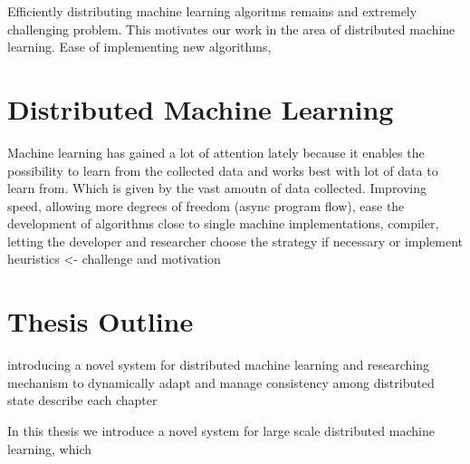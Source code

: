 Efficiently distributing machine learning algoritms remains and extremely challenging problem. This motivates our work in the area of distributed machine learning. Ease of implementing new algorithms, 


\section{Distributed Machine Learning}
Machine learning has gained a lot of attention lately because it enables the possibility to learn from the collected data and works best with lot of data to learn from. Which is given by the vast amoutn of data collected. 
Improving speed, allowing more degrees of freedom (async program flow), ease the development of algorithms close to single machine implementations, compiler, letting the developer and researcher choose the strategy if necessary or implement heuristics <- challenge and motivation

\section{Thesis Outline}
introducing a novel system for distributed machine learning and researching mechanism to dynamically adapt and manage consistency among distributed state
describe each chapter

In this thesis we introduce a novel system for large scale distributed machine learning, which 